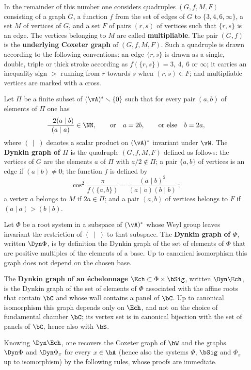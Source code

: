 \documentclass[12pt,a4paper,oneside,english]{smfart}
\makeatletter
\newcommand{\btanchor}[1]{\leavevmode\Hy@raisedlink{\hypertarget{bt:#1}{}}}
\theoremstyle{definition}
\theoremstyle{bt}
\makeatother
\begin{document}
\btanchor{1.4.4}
In the remainder of this number one considers quadruples $(G,f,M,F)$ consisting of a graph $G$, a function $f$ from the set of edges of $G$ to $\{3,4,6,\infty\}$, a set $M$ of vertices of $G$, and a set $F$ of pairs $(r,s)$ of vertices such that $\{r,s\}$ is an edge.  The vertices belonging to $M$ are called \textbf{multipliable}.  The pair $(G,f)$ is the
\textbf{underlying Coxeter graph} of $(G,f,M,F)$.  Such a quadruple is drawn
according to the following conventions: an edge $\{r,s\}$ is drawn as a single, double, triple or thick stroke according as $f(\{r,s\})=3,\ 4,\ 6$ or $\infty$; it carries an inequality sign $>$ running from $r$ towards $s$ when $(r,s)\in F$; and multipliable vertices are marked with a cross.

\medskip
Let $\Pi$ be a finite subset of $(\vA)^{*}\smallsetminus\{0\}$ such that for every pair $(a,b)$ of elements of $\Pi$ one has
\[
  \frac{-2(a\mid b)}{(a\mid a)}\in\NN,
  \qquad\text{or}\quad a=2b,
  \qquad\text{or else}\quad b=2a,
\]
where $(\ \mid\ )$ denotes a scalar product on $(\vA)^{*}$ invariant under $\vW$.  The \textbf{Dynkin graph of $\Pi$} is the quadruple $(G,f,M,F)$ defined as follows: the vertices of $G$ are the elements $a$ of $\Pi$ with $a/2\notin\Pi$; a pair $\{a,b\}$ of vertices is an edge if $(a\mid b)\neq 0$; the function $f$ is defined by
\[
  \cos^{2}\frac{\pi}{f(\{a,b\})}
  =\frac{(a\mid b)^{2}}{(a\mid a)(b\mid b)}\,;
\]
a vertex $a$ belongs to $M$ if $2a\in\Pi$; and a pair $(a,b)$ of vertices belongs to $F$ if $(a\mid a)>(b\mid b)$.

\medskip
Let $\Phi$ be a root system in a subspace of $(\vA)^{*}$ whose Weyl group leaves invariant the restriction of $(\ \mid\ )$ to that subspace.  The
\textbf{Dynkin graph of $\Phi$}, written $\Dyn\Phi$, is by definition the
Dynkin graph of the set of elements of $\Phi$ that are positive multiples of the elements of a base.  Up to canonical isomorphism this graph does not depend on the chosen base.

\btanchor{1.4.5}
The \textbf{Dynkin graph of an \'echelonnage} $\Ech\subset\Phi\times\bSig$, written $\Dyn\Ech$, is the Dynkin graph of the set of elements of $\Phi$ associated with the affine roots that contain $\bC$ and whose wall contains a panel of $\bC$.  Up to canonical isomorphism this graph depends only on $\Ech$, and not on the choice of fundamental chamber $\bC$; its vertex set is in canonical bijection with the set of panels of $\bC$, hence also with $\bS$.

\smallskip
Knowing $\Dyn\Ech$, one recovers the Coxeter graph of $\bW$ and the graphs $\Dyn\Phi$ and $\Dyn\Phi_x$ for every $x\in\bA$ (hence also the systems $\Phi$, $\bSig$ and $\Phi_x$ up to isomorphism) by the following rules, whose proofs are immediate.
\end{document}
